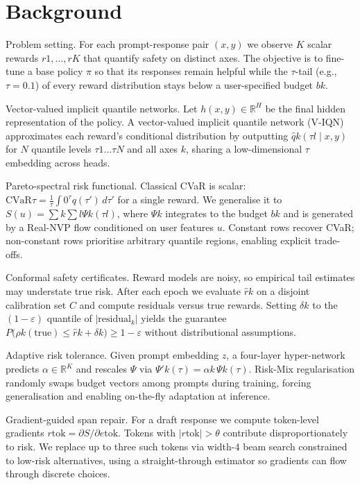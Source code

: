 \documentclass{article}
\begin{document}
\section{Background}
Problem setting. For each prompt-response pair $(x,y)$ we observe $K$ scalar rewards $r1,\ldots,rK$ that quantify safety on distinct axes. The objective is to fine-tune a base policy $\pi$ so that its responses remain helpful while the $\tau$-tail (e.g., $\tau=0.1$) of every reward distribution stays below a user-specified budget $bk$.

Vector-valued implicit quantile networks. Let $h(x,y)\in\mathbb{R}^H$ be the final hidden representation of the policy. A vector-valued implicit quantile network (V-IQN) approximates each reward's conditional distribution by outputting $\hat{q}k(\taul\mid x,y)$ for $N$ quantile levels $\tau1\ldots\tauN$ and all axes $k$, sharing a low-dimensional $\tau$ embedding across heads.

Pareto-spectral risk functional. Classical CVaR is scalar: $\mathrm{CVaR}\tau = \frac{1}{\tau}\int0^\tau q(\tau')\,d\tau'$ for a single reward. We generalise it to $S(u)=\sumk \suml \Psik(\taul)$, where $\Psik$ integrates to the budget $bk$ and is generated by a Real-NVP flow conditioned on user features $u$. Constant rows recover CVaR; non-constant rows prioritise arbitrary quantile regions, enabling explicit trade-offs.

Conformal safety certificates. Reward models are noisy, so empirical tail estimates may understate true risk. After each epoch we evaluate $\hat{r}k$ on a disjoint calibration set $C$ and compute residuals versus true rewards. Setting $\deltak$ to the $(1-\varepsilon)$ quantile of $\lvert\text{residual}_k\rvert$ yields the guarantee $P\big(\rhok(\text{true}) \le \hat{r}k + \deltak\big) \ge 1-\varepsilon$ without distributional assumptions.

Adaptive risk tolerance. Given prompt embedding $z$, a four-layer hyper-network predicts $\alpha\in\mathbb{R}^K$ and rescales $\Psi$ via $\Psi'k(\tau)=\alphak \, \Psik(\tau)$. Risk-Mix regularisation randomly swaps budget vectors among prompts during training, forcing generalisation and enabling on-the-fly adaptation at inference.

Gradient-guided span repair. For a draft response we compute token-level gradients $r\text{tok} = \partial S/\partial e\text{tok}$. Tokens with $\lvert r\text{tok}\rvert>\theta$ contribute disproportionately to risk. We replace up to three such tokens via width-4 beam search constrained to low-risk alternatives, using a straight-through estimator so gradients can flow through discrete choices.
\end{document}
